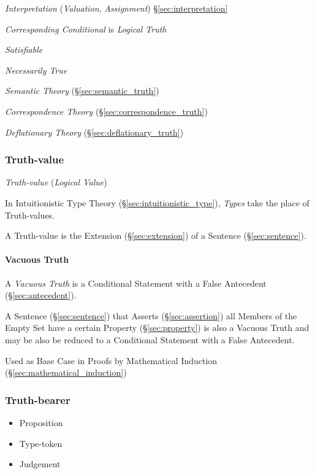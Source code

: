 \emph{Interpretation} (\emph{Valuation}, \emph{Assignment})
\S\ref{sec:interpretation}

\emph{Corresponding Conditional} is \emph{Logical Truth}

\emph{Satisfiable}

\emph{Necessarily True}

\emph{Semantic Theory} (\S\ref{sec:semantic_truth})

\emph{Correspondence Theory} (\S\ref{sec:correspondence_truth})

\emph{Deflationary Theory} (\S\ref{sec:deflationary_truth})



\subsubsection{Truth-value}\label{sec:truth_value}

\emph{Truth-value} (\emph{Logical Value})

In Intuitionistic Type Theory (\S\ref{sec:intuitionistic_type}),
\emph{Types} take the place of Truth-values.

A Truth-value is the Extension (\S\ref{sec:extension}) of a Sentence
(\S\ref{sec:sentence}).



\paragraph{Vacuous Truth}\label{sec:vacuous_truth}\hfill

A \emph{Vacuous Truth} is a Conditional Statement with a False
Antecedent (\S\ref{sec:antecedent}).

A Sentence (\S\ref{sec:sentence}) that Asserts (\S\ref{sec:assertion})
all Members of the Empty Set have a certain Property
(\S\ref{sec:property}) is also a Vacuous Truth and may be also be
reduced to a Conditional Statement with a False Antecedent.

Used as Base Case in Proofs by Mathematical Induction
(\S\ref{sec:mathematical_induction})



\subsubsection{Truth-bearer}\label{sec:truth_bearer}

\begin{itemize}
  \item Proposition
  \item Type-token
  \item Judgement
\end{itemize}



